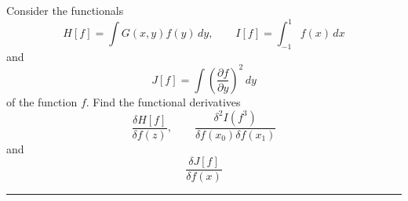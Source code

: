 \documentclass[12pt]{article}
\begin{document}
Consider the functionals
\begin{equation*}
H[f]=\int G(x,y)f(y)\,dy,
\qquad
I[f]=\int_{-1}^1f(x)\,dx
\end{equation*}
and
\begin{equation*}
J[f]=\int\left(\frac{\partial f}{\partial y}\right)^2\,dy
\end{equation*}
of the function $f$.
Find the functional derivatives
\begin{equation*}
\frac{\delta H[f]}{\delta f(z)},
\qquad
\frac{\delta^2I(f^3)}{\delta f(x_0)\delta f(x_1)}
\end{equation*}
and
\begin{equation*}
\frac{\delta J[f]}{\delta f(x)}
\end{equation*}

\bigskip
\hrule

\bigskip
\end{document}
